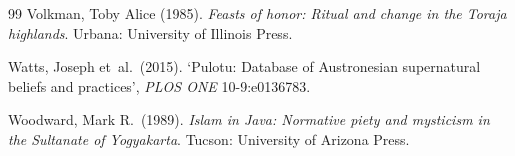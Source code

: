 \documentclass[12pt,a4paper]{article}
\begin{document}
\begin{thebibliography}{99}
Volkman, Toby Alice (1985). \textit{Feasts of honor: Ritual and change in the Toraja highlands}. Urbana: University of Illinois Press.

Watts, Joseph et~al.\ (2015). `Pulotu: Database of Austronesian supernatural beliefs and practices', \textit{PLOS ONE} 10-9:e0136783.

Woodward, Mark R.\ (1989). \textit{Islam in Java: Normative piety and mysticism in the Sultanate of Yogyakarta}. Tucson: University of Arizona Press.

\end{thebibliography}
\end{document}
